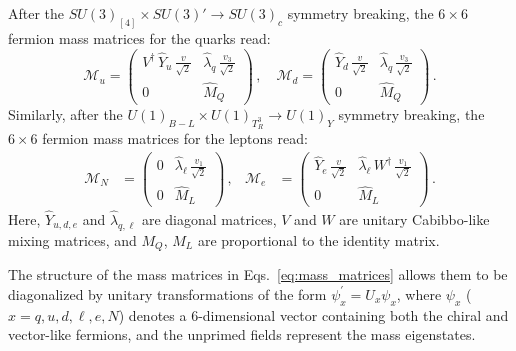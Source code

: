After the $SU(3)_{[4]}\times SU(3)'\to SU(3)_c$ symmetry breaking, the $6\times6$ fermion mass matrices for the quarks read:
\begin{equation}
  \mathcal{M}_u=
\begin{pmatrix}
V^\dagger\, \hat Y_u\,\frac{v}{\sqrt{2}} &\hat\lambda_q\,\frac{v_3}{\sqrt{2}}\\[2pt]
0 & \hat M_Q
\end{pmatrix}\,,\quad
\mathcal{M}_d=
\begin{pmatrix}
\hat Y_d\,\frac{v}{\sqrt{2}} &\hat\lambda_q\,\frac{v_3}{\sqrt{2}}\\[2pt]
0 & \hat M_Q
\end{pmatrix}\,.
\end{equation}
Similarly, after the $U(1)_{B-L}\times U(1)_{T_R^3}\to U(1)_Y$ symmetry breaking, the $6\times6$ fermion mass matrices for the leptons read:
\begin{align}\label{eq:mass_matrices}
\mathcal{M}_N&=
\begin{pmatrix}
0 &\hat\lambda_\ell\,\frac{v_1}{\sqrt{2}}\\[2pt]
0 & \hat M_L
\end{pmatrix}\,, &
\mathcal{M}_e&=
\begin{pmatrix}
\hat Y_e\,\frac{v}{\sqrt{2}} &\hat\lambda_\ell\,W^\dagger\,\frac{v_1}{\sqrt{2}}\\[2pt]
0 & \hat M_L
\end{pmatrix}\,.
\end{align}
Here, $\hat Y_{u,d,e}$ and $\hat \lambda_{q,\ell}$ are diagonal matrices, $V$ and $W$ are unitary Cabibbo-like mixing matrices, and $M_Q$, $M_L$ are proportional to the identity matrix.

The structure of the mass matrices in Eqs.~\eqref{eq:mass_matrices} allows them to be diagonalized by unitary transformations of the form $\psi_x^\prime = U_x \psi_x$, where $\psi_x$ ($x = q, u, d, \ell, e, N$) denotes a 6-dimensional vector containing both the chiral and vector-like fermions, and the unprimed fields represent the mass eigenstates. 

